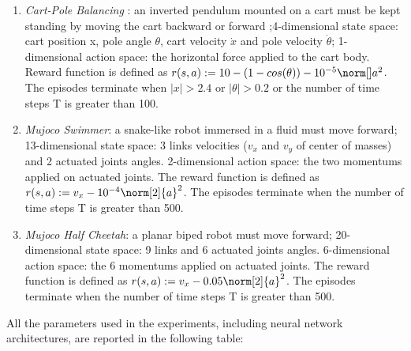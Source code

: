 \begin{enumerate}
	\item \emph{Cart-Pole Balancing} : an inverted pendulum mounted on a cart must be kept standing by moving the cart backward or forward ;4-dimensional state space: cart position x, pole angle $\theta$, cart velocity $\dot{x}$ and pole velocity $\dot{\theta}$; 1-dimensional action space: the horizontal force applied to the cart body. Reward function  is defined as $r(s, a) := 10 - (1 - cos(\theta)) - 10^{-5}\norm[] a^2$. The episodes terminate when $|x|>2.4$ or $|\theta|>0.2$ or the number of time steps T is greater than 100.
	\item \emph{Mujoco Swimmer}: a snake-like robot immersed in a fluid must move forward; 13-dimensional state space: 3 links velocities ($v_x$ and $v_y$ of center of masses) and 2 actuated joints angles. 2-dimensional action space: the two momentums applied on actuated joints.  The reward function is defined as $r(s, a) := v_x - 10^{-4}\norm[2]{a}^2$. The episodes terminate when the number of time steps T is greater than 500.
	\item \emph{Mujoco Half Cheetah}: a planar biped robot must move forward; 20-dimensional state space: 9 links and 6 actuated joints angles. 6-dimensional action space: the 6 momentums applied on actuated joints.  The reward function is defined as $r(s, a) := v_x - 0.05\norm[2]{a}^2$. The episodes terminate when the number of time steps T is greater than 500.
\end{enumerate}

All the parameters used in the experiments, including neural network architectures, are reported in the following table:

